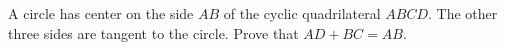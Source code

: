 A circle has center on the side $AB$ of the cyclic quadrilateral $ABCD$. The other three sides are tangent to the circle. Prove that $AD+BC=AB$.